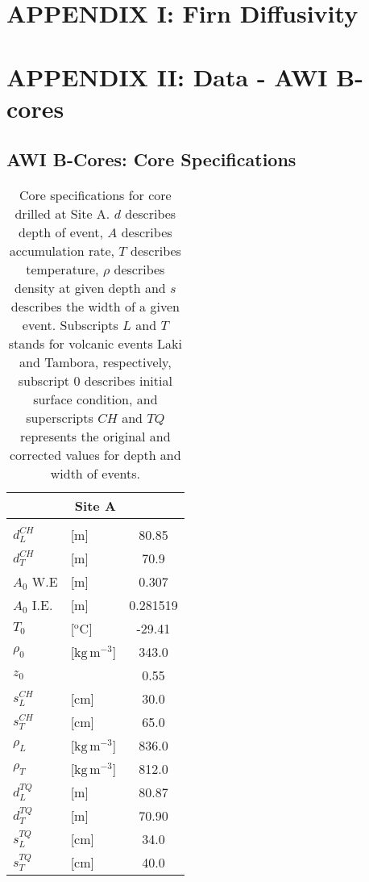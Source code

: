 \documentclass[../../CompleteThesis2/Complete_2ndDraft.tex]{subfiles}
\begin{document}
	\section[Appendix I]{APPENDIX I: Firn Diffusivity}
	\label{AppI:FirnDiffusivity}


	\newpage	
	\section[Appendix II]{APPENDIX II: Data - AWI B-cores}
	\label{AppII:Data_AWI}
	
	
	\subsection[Core Specs]{AWI B-Cores: Core Specifications}
	\begin{table}[h]
		\centering
		\begin{tabular}{l l|c}
			\multicolumn{3}{c}{\textbf{Site A}} \\[0.1cm] 
			\hline 
			&& \\
			$d_{L}^{CH}$ & [m] & 80.85 \\[0.15cm]
			$d_{T}^{CH}$ & [m] & 70.9 \\[0.15cm]
			$A_0$ W.E & [m] & 0.307 \\[0.15cm]
			$A_0$ I.E. & [m] & 0.281519 \\[0.15cm]
			$T_0$ & [$^{\text{o}}$C] & -29.41 \\[0.15cm]
			$\rho_0$ & [$\text{kg}\,\text{m}^{-3}$] & 343.0\\[0.15cm]
			$z_0$ & & 0.55 \\[0.15cm]
			$s_L^{CH}$ & [cm] & 30.0 \\[0.15cm]
			$s_T^{CH}$ & [cm] & 65.0 \\[0.15cm]
			$\rho_L$ & [$\text{kg}\,\text{m}^{-3}$] & 836.0 \\[0.15cm]
			$\rho_T$ & [$\text{kg}\,\text{m}^{-3}$] & 812.0 \\[0.15cm]		
			$d_{L}^{TQ}$ & [m] & 80.87 \\[0.15cm]
			$d_{T}^{TQ}$ & [m] & 70.90 \\[0.15cm]
			$s_L^{TQ}$ & [cm] & 34.0 \\[0.15cm]
			$s_T^{TQ}$ & [cm] & 40.0 \\[0.15cm]
			
		\end{tabular}
		\caption{\footnotesize Core specifications for core drilled at Site A. $d$ describes depth of event, $A$ describes accumulation rate, $T$ describes temperature, $\rho$ describes density at given depth and $s$ describes the width of a given event. Subscripts $L$ and $T$ stands for volcanic events Laki and Tambora, respectively, subscript $0$ describes initial surface condition, and superscripts $CH$ and $TQ$ represents the original and corrected values for depth and width of events.}
		\label{Tab:AWI_Bcores_CoreSpecs}
	\end{table}
	
\end{document}
